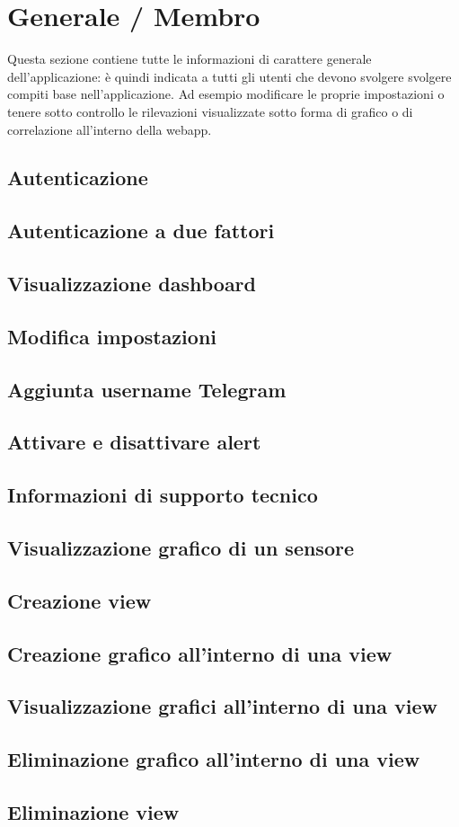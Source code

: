 \section{Generale / Membro}
Questa sezione contiene tutte le informazioni di carattere generale dell'applicazione: è quindi indicata a tutti gli utenti che devono svolgere svolgere compiti base nell'applicazione. Ad esempio modificare le proprie impostazioni o tenere sotto controllo le rilevazioni visualizzate sotto forma di grafico o di correlazione all'interno della webapp.

\subsection{Autenticazione}
\subsection{Autenticazione a due fattori}
\subsection{Visualizzazione dashboard}
\subsection{Modifica impostazioni}
\subsection{Aggiunta username Telegram}
\subsection{Attivare e disattivare alert}
\subsection{Informazioni di supporto tecnico}
\subsection{Visualizzazione grafico di un sensore}
\subsection{Creazione view}
\subsection{Creazione grafico all'interno di una view}
\subsection{Visualizzazione grafici all'interno di una view}
\subsection{Eliminazione grafico all'interno di una view}
\subsection{Eliminazione view}

